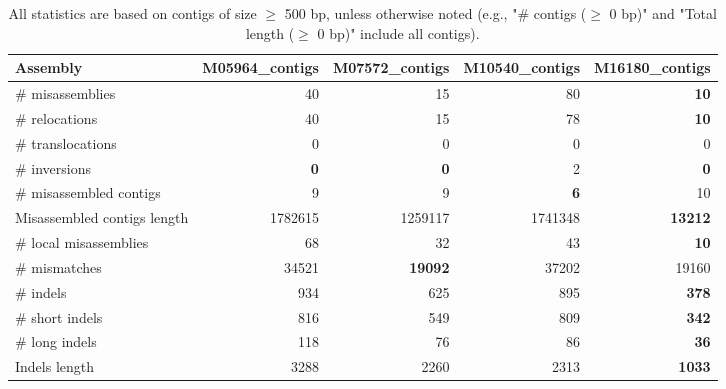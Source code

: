 \documentclass[12pt,a4paper]{article}
\begin{document}
\begin{table}[ht]
\begin{center}
\caption{All statistics are based on contigs of size $\geq$ 500 bp, unless otherwise noted (e.g., "\# contigs ($\geq$ 0 bp)" and "Total length ($\geq$ 0 bp)" include all contigs).}
\begin{tabular}{|l*{4}{|r}|}
\hline
Assembly & M05964\_contigs & M07572\_contigs & M10540\_contigs & M16180\_contigs \\ \hline
\# misassemblies & 40 & 15 & 80 & {\bf 10} \\ \hline
\hspace{5mm}\# relocations & 40 & 15 & 78 & {\bf 10} \\ \hline
\hspace{5mm}\# translocations & 0 & 0 & 0 & 0 \\ \hline
\hspace{5mm}\# inversions & {\bf 0} & {\bf 0} & 2 & {\bf 0} \\ \hline
\# misassembled contigs & 9 & 9 & {\bf 6} & 10 \\ \hline
Misassembled contigs length & 1782615 & 1259117 & 1741348 & {\bf 13212} \\ \hline
\# local misassemblies & 68 & 32 & 43 & {\bf 10} \\ \hline
\# mismatches & 34521 & {\bf 19092} & 37202 & 19160 \\ \hline
\# indels & 934 & 625 & 895 & {\bf 378} \\ \hline
\hspace{5mm}\# short indels & 816 & 549 & 809 & {\bf 342} \\ \hline
\hspace{5mm}\# long indels & 118 & 76 & 86 & {\bf 36} \\ \hline
Indels length & 3288 & 2260 & 2313 & {\bf 1033} \\ \hline
\end{tabular}
\end{center}
\end{table}
\end{document}
